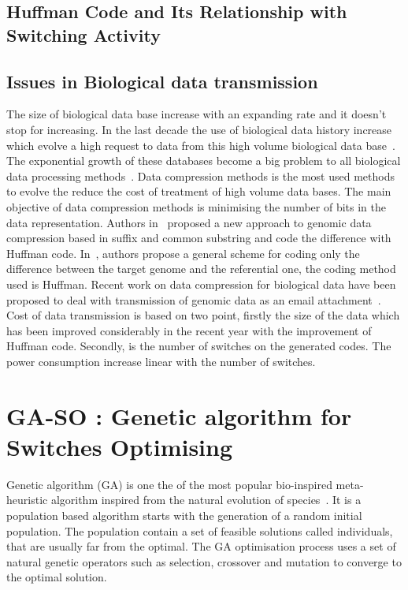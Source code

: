 \documentclass[preprint,12pt]{elsarticle}
\begin{document}
\subsection{Huffman Code and Its Relationship with Switching Activity}

\subsection{Issues in Biological data transmission}
The size of biological data base increase with an expanding rate and it doesn't stop for increasing. In the last decade the use of biological data history increase which evolve a high request to data from this high volume biological data base~\cite{Doug08}. The exponential growth of these databases become a big problem to all biological data processing methods~\cite{Doug08}. Data compression methods is the most used methods to evolve the reduce the cost of treatment of high volume data bases. The main objective of data compression methods is minimising the number of bits in the data representation. Authors in~\cite{bra09} proposed a new approach to genomic data compression based in suffix and common substring and code the difference with Huffman code. In~\cite{chr09}, authors propose a general scheme for coding only the difference between the target genome and the referential one, the coding method used is Huffman. Recent work on data compression for biological data have been proposed to deal with transmission of genomic data as an email attachment~\cite{wan11}. Cost of data transmission is based on two point, firstly the size of the data which has been improved considerably in the recent year with the improvement of Huffman code. Secondly, is the number of switches on the generated codes. The power consumption increase linear with the number of switches.
\section{GA-SO : Genetic algorithm for Switches Optimising}
Genetic algorithm (GA) is one the of the most popular bio-inspired meta-heuristic algorithm inspired from the natural evolution of species~\cite{gen1}. It is a  population based algorithm starts with the generation of a random initial population. The population contain a set of feasible solutions called individuals, that are usually far from the optimal. The GA optimisation process uses a set of natural genetic operators such as selection, crossover and mutation to converge to the optimal solution.
\end{document}
